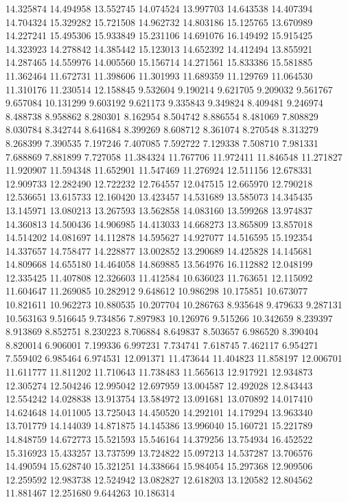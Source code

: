 14.325874
14.494958
13.552745
14.074524
13.997703
14.643538
14.407394
14.704324
15.329282
15.721508
14.962732
14.803186
15.125765
13.670989
14.227241
15.495306
15.933849
15.231106
14.691076
16.149492
15.915425
14.323923
14.278842
14.385442
15.123013
14.652392
14.412494
13.855921
14.287465
14.559976
14.005560
15.156714
14.271561
15.833386
15.581885
11.362464
11.672731
11.398606
11.301993
11.689359
11.129769
11.064530
11.310176
11.230514
12.158845
9.532604
9.190214
9.621705
9.209032
9.561767
9.657084
10.131299
9.603192
9.621173
9.335843
9.349824
8.409481
9.246974
8.488738
8.958862
8.280301
8.162954
8.504742
8.886554
8.481069
7.808829
8.030784
8.342744
8.641684
8.399269
8.608712
8.361074
8.270548
8.313279
8.268399
7.390535
7.197246
7.407085
7.592722
7.129338
7.508710
7.981331
7.688869
7.881899
7.727058
11.384324
11.767706
11.972411
11.846548
11.271827
11.920907
11.594348
11.652901
11.547469
11.276924
12.511156
12.678331
12.909733
12.282490
12.722232
12.764557
12.047515
12.665970
12.790218
12.536651
13.615733
12.160420
13.423457
14.531689
13.585073
14.345435
13.145971
13.080213
13.267593
13.562858
14.083160
13.599268
13.974837
14.360813
14.500436
14.906985
14.413033
14.668273
13.865809
13.857018
14.514202
14.081697
14.112878
14.595627
14.927077
14.516595
15.192354
14.337657
14.758477
14.228877
13.002852
13.290689
14.425828
14.145681
14.809668
14.655180
14.464058
14.869885
13.564976
16.112882
12.048199
12.335425
11.407808
12.326603
11.412584
10.636023
11.763651
12.115092
11.604647
11.269085
10.282912
9.648612
10.986298
10.175851
10.673077
10.821611
10.962273
10.880535
10.207704
10.286763
8.935648
9.479633
9.287131
10.563163
9.516645
9.734856
7.897983
10.126976
9.515266
10.342659
8.239397
8.913869
8.852751
8.230223
8.706884
8.649837
8.503657
6.986520
8.390404
8.820014
6.906001
7.199336
6.997231
7.734741
7.618745
7.462117
6.954271
7.559402
6.985464
6.974531
12.091371
11.473644
11.404823
11.858197
12.006701
11.611777
11.811202
11.710643
11.738483
11.565613
12.917921
12.934873
12.305274
12.504246
12.995042
12.697959
13.004587
12.492028
12.843443
12.554242
14.028838
13.913754
13.584972
13.091681
13.070892
14.017410
14.624648
14.011005
13.725043
14.450520
14.292101
14.179294
13.963340
13.701779
14.144039
14.871875
14.145386
13.996040
15.160721
15.221789
14.848759
14.672773
15.521593
15.546164
14.379256
13.754934
16.452522
15.316923
15.433257
13.737599
13.724822
15.097213
14.537287
13.706576
14.490594
15.628740
15.321251
14.338664
15.984054
15.297368
12.909506
12.259592
12.983738
12.524942
13.082827
12.618203
13.120582
12.804562
11.881467
12.251680
9.644263
10.186314
